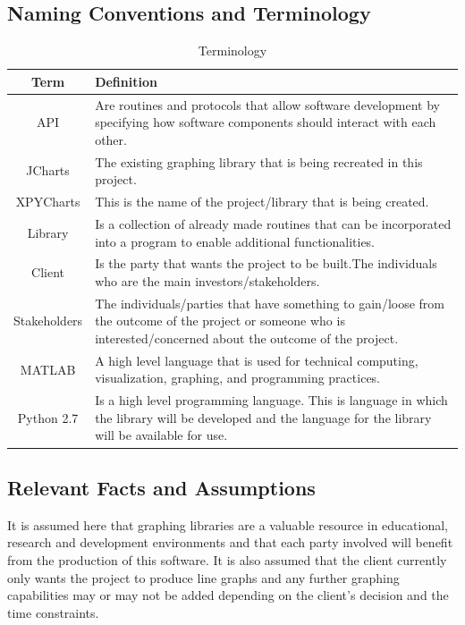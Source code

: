\documentclass[12pt, titlepage]{article}
\begin{document}
\subsection{Naming Conventions and Terminology}
\begin{center}
\begin{table}[!hpb]
    \caption{Terminology} 
    \begin{tabular}{ |c|p{11cm}|}
	\hline
	Term & Definition\\ \hline
	API & Are routines and protocols that allow software development by specifying how software components should interact with each other.  \\ \hline
	JCharts & The existing graphing library that is being recreated in this project.\\ \hline
	XPYCharts & This is the name of the project/library that is being created.\\ \hline
	Library & Is a collection of already made routines that can be incorporated into a program to enable additional functionalities.\\ \hline
	Client & Is the party that wants the project to be built.The individuals who are the main investors/stakeholders.\\ \hline
	Stakeholders & The individuals/parties that have something to gain/loose from the outcome of the project or someone who is interested/concerned about the outcome of the project.\\ \hline
	MATLAB & A high level language that is used for technical computing, visualization, graphing, and programming practices.\\ \hline
	Python 2.7 & Is a high level programming language. This is language in which the library will be developed and the language for the library will be available for use.\\ \hline
    \end{tabular}
\end{table}
\end{center}
\subsection{Relevant Facts and Assumptions}
It is assumed here that graphing libraries are a valuable resource in educational, research and development environments and that each party involved will benefit from the production of this software. It is also assumed that the client currently only wants the project to produce line graphs and any further graphing capabilities may or may not be added depending on the client's decision and the time constraints.
\clearpage
\end{document}
